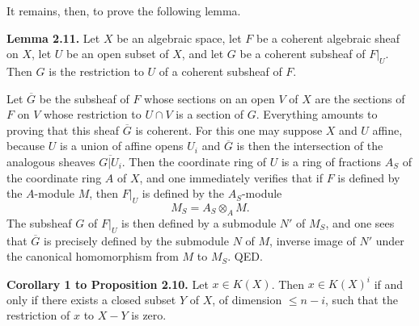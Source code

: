 It remains, then, to prove the following lemma.

\textbf{Lemma 2.11.} Let $X$ be an algebraic space, let $F$ be a coherent algebraic sheaf on $X$, let $U$ be an open subset of $X$, and let $G$ be a coherent subsheaf of $F|_U$. Then $G$ is the restriction to $U$ of a coherent subsheaf of $F$.

Let $\overline G$ be the subsheaf of $F$ whose sections on an open $V$ of $X$ are the sections of $F$ on $V$ whose restriction to $U\cap V$ is a section of $G$. Everything amounts to proving that this sheaf $\overline G$ is coherent. For this one may suppose $X$ and $U$ affine, because $U$ is a union of affine opens $U_i$ and $\overline G$ is then the intersection of the analogous sheaves $\overline{G|U_i}$. Then the coordinate ring of $U$ is a ring of fractions $A_S$ of the coordinate ring $A$ of $X$, and one immediately verifies that if $F$ is defined by the $A$-module $M$, then $F|_U$ is defined by the $A_S$-module
\[
 M_S=A_S\otimes_A M.
\]
The subsheaf $G$ of $F|_U$ is then defined by a submodule $N'$ of $M_S$, and one sees that $\overline G$ is precisely defined by the submodule $N$ of $M$, inverse image of $N'$ under the canonical homomorphism from $M$ to $M_S$. QED.

\textbf{Corollary 1 to Proposition 2.10.} Let $x\in K(X)$. Then $x\in K(X)^i$ if and only if there exists a closed subset $Y$ of $X$, of dimension $\leq n-i$, such that the restriction of $x$ to $X-Y$ is zero.

